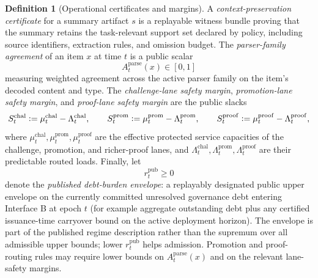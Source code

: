 \documentclass[11pt]{article}
\theoremstyle{definition}
\newtheorem{definition}[theorem]{Definition}
\newcommand{\1}{\mathbf{1}}
\newcommand{\Defeq}{\vcentcolon=}
\begin{document}
\begin{definition}[Operational certificates and margins]\label{def:operational_certificates}
A \emph{context-preservation certificate} for a summary artifact $s$ is a replayable witness bundle proving that the summary retains the task-relevant support set declared by policy, including source identifiers, extraction rules, and omission budget. The \emph{parser-family agreement} of an item $x$ at time $t$ is a public scalar
\[
A_t^{\mathrm{parse}}(x)\in[0,1]
\]
measuring weighted agreement across the active parser family on the item's decoded content and type. The \emph{challenge-lane safety margin}, \emph{promotion-lane safety margin}, and \emph{proof-lane safety margin} are the public slacks
\[
S_t^{\mathrm{chal}}\Defeq \mu_t^{\mathrm{chal}}-\Lambda_t^{\mathrm{chal}},\qquad
S_t^{\mathrm{prom}}\Defeq \mu_t^{\mathrm{prom}}-\Lambda_t^{\mathrm{prom}},\qquad
S_t^{\mathrm{proof}}\Defeq \mu_t^{\mathrm{proof}}-\Lambda_t^{\mathrm{proof}},
\]
where $\mu_t^{\mathrm{chal}},\mu_t^{\mathrm{prom}},\mu_t^{\mathrm{proof}}$ are the effective protected service capacities of the challenge, promotion, and richer-proof lanes, and $\Lambda_t^{\mathrm{chal}},\Lambda_t^{\mathrm{prom}},\Lambda_t^{\mathrm{proof}}$ are their predictable routed loads. Finally, let
\[
r_t^{\mathrm{pub}}\ge 0
\]
denote the \emph{published debt-burden envelope}: a replayably designated public upper envelope on the currently committed unresolved governance debt entering Interface B at epoch $t$ (for example aggregate outstanding debt plus any certified issuance-time carryover bound on the active deployment horizon). The envelope is part of the published regime description rather than the supremum over all admissible upper bounds; lower $r_t^{\mathrm{pub}}$ helps admission. Promotion and proof-routing rules may require lower bounds on $A_t^{\mathrm{parse}}(x)$ and on the relevant lane-safety margins.
\end{definition}
\end{document}
